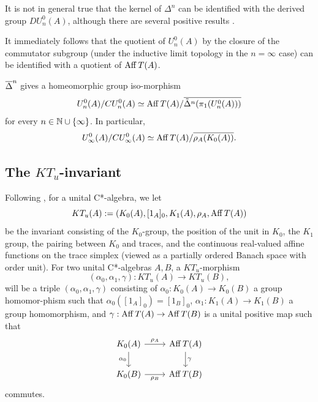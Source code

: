 \documentclass[12pt]{amsart}
\begin{document}
It is not in general true that the kernel of $\Delta^n$ can be identified with the derived group $DU_n^0(A)$, although there are several positive results \cite{dlHS84b,Thomsen93,Ng14,NgRobert17,NgRobert15}. 

It immediately follows that the quotient of $U_n^0(A)$ by the closure of the commutator subgroup (under the inductive limit topology in the $n = \infty$ case) can be identified with a quotient of $\operatorname{Aff} T(A)$.

\begin{theorem}\label{theorem:thomsen-iso}
$\overline\Delta^n$ gives a homeomorphic group iso\hyp{}morphism
\begin{equation}
U_n^0(A)/CU_n^0(A) \simeq \operatorname{Aff} T(A)/\overline{\tilde{\Delta}^n(\pi_1(U_n^0(A)))}
\end{equation}
for every $n \in \mathbb{N} \cup \{\infty\}$. In particular,
\begin{equation}
U_{\infty}^0(A)/CU_{\infty}^0(A) \simeq \operatorname{Aff} T(A)/\overline{\rho_A(K_0(A))}.
\end{equation}
\end{theorem}

          
\subsection{The $KT_u$-invariant}

Following \cite{CGSTW23}, for a unital C*-algebra, we let
\begin{equation}
KT_u(A) := (K_0(A),[1_A]_0,K_1(A),\rho_A,\operatorname{Aff} T(A))
\end{equation}
be the invariant consisting of the $K_0$-group, the position of the unit in $K_0$, the $K_1$ group, the pairing between $K_0$ and traces, and the continuous real-valued affine functions on the trace simplex (viewed as a partially ordered Banach space with order unit). 
For two unital C*-algebras $A,B$, a $KT_u$-morphism
\begin{equation}
(\alpha_0,\alpha_1,\gamma): KT_u(A) \to KT_u(B),
\end{equation}
will be a triple $(\alpha_0,\alpha_1,\gamma)$ consisting of $\alpha_0: K_0(A) \to K_0(B)$ a group homomor\hyp{}phism such that $\alpha_0([1_A]_0) = [1_B]_0$, $\alpha_1: K_1(A) \to K_1(B)$ a group homomorphism, and $\gamma: \operatorname{Aff} T(A) \to \operatorname{Aff} T(B)$ is a unital positive map such that
\begin{equation}
\begin{tikzcd}
K_0(A) \arrow[r, "\rho_A"] \arrow[d, "\alpha_0"'] & \Aff T(A) \arrow[d, "\gamma"] \\
K_0(B) \arrow[r, "\rho_B"']                       & \Aff T(B)                    
\end{tikzcd}
\end{equation}
commutes. 
\end{document}
